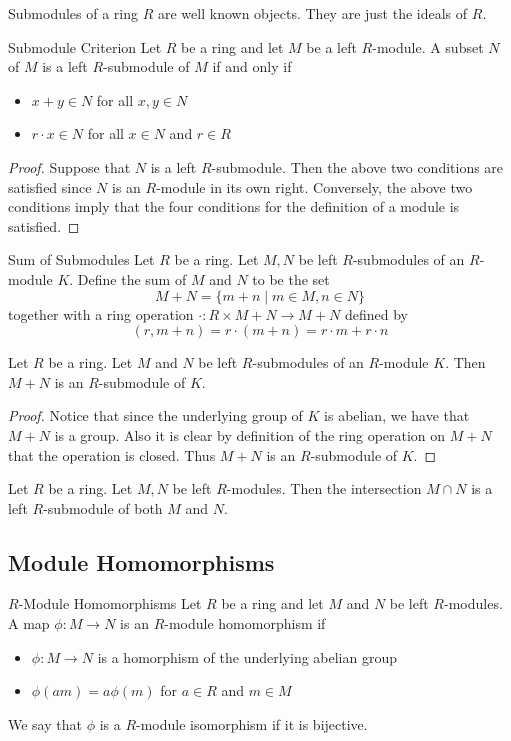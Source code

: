 \documentclass[a4paper]{article}
\begin{document}
Submodules of a ring $R$ are well known objects. They are just the ideals of $R$. 

\begin{prp}{Submodule Criterion}{} Let $R$ be a ring and let $M$ be a left $R$-module. A subset $N$ of $M$ is a left $R$-submodule of $M$ if and only if
\begin{itemize}
\item $x+y\in N$ for all $x,y\in N$
\item $r\cdot x\in N$ for all $x\in N$ and $r\in R$
\end{itemize} \tcbline
\begin{proof}
Suppose that $N$ is a left $R$-submodule. Then the above two conditions are satisfied since $N$ is an $R$-module in its own right. Conversely, the above two conditions imply that the four conditions for the definition of a module is satisfied. 
\end{proof}
\end{prp}

\begin{defn}{Sum of Submodules}{} Let $R$ be a ring. Let $M,N$ be left $R$-submodules of an $R$-module $K$. Define the sum of $M$ and $N$ to be the set $$M+N=\{m+n\;|\;m\in M,n\in N\}$$ together with a ring operation $\cdot:R\times M+N\to M+N$ defined by $$(r,m+n)=r\cdot(m+n)=r\cdot m+r\cdot n$$
\end{defn}

\begin{lmm}{}{} Let $R$ be a ring. Let $M$ and $N$ be left $R$-submodules of an $R$-module $K$. Then $M+N$ is an $R$-submodule of $K$. \tcbline
\begin{proof}
Notice that since the underlying group of $K$ is abelian, we have that $M+N$ is a group. Also it is clear by definition of the ring operation on $M+N$ that the operation is closed. Thus $M+N$ is an $R$-submodule of $K$. 
\end{proof}
\end{lmm}

\begin{lmm}{}{} Let $R$ be a ring. Let $M,N$ be left $R$-modules. Then the intersection $M\cap N$ is a left $R$-submodule of both $M$ and $N$. 
\end{lmm}

\subsection{Module Homomorphisms}
\begin{defn}{$R$-Module Homomorphisms}{} Let $R$ be a ring and let $M$ and $N$ be left $R$-modules. A map $\phi:M\to N$ is an $R$-module homomorphism if 
\begin{itemize}
\item $\phi:M\to N$ is a homorphism of the underlying abelian group
\item $\phi(am)=a\phi(m)$ for $a\in R$ and $m\in M$
\end{itemize}
We say that $\phi$ is a $R$-module isomorphism if it is bijective. 
\end{defn}
\end{document}
